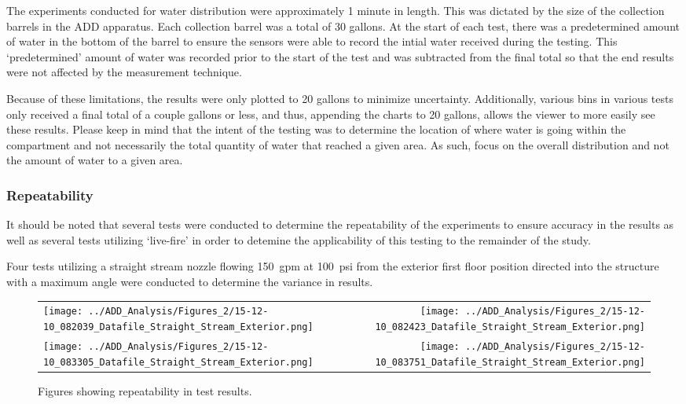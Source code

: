 \documentclass{article}
\begin{document}
The experiments conducted for water distribution were approximately 1 minute in length. This was dictated by the size of the collection barrels in the ADD apparatus. Each collection barrel was a total of 30 gallons. At the start of each test, there was a predetermined amount of water in the bottom of the barrel to ensure the sensors were able to record the intial water received during the testing. This `predetermined' amount of water was recorded prior to the start of the test and was subtracted from the final total so that the end results were not affected by the measurement technique. 

Because of these limitations, the results were only plotted to 20 gallons to minimize uncertainty. Additionally, various bins in various tests only received a final total of a couple gallons or less, and thus, appending the charts to 20 gallons, allows the viewer to more easily see these results. Please keep in mind that the intent of the testing was to determine the location of where water is going within the compartment and not necessarily the total quantity of water that reached a given area. As such, focus on the overall distribution and not the amount of water to a given area.

\subsubsection{Repeatability}

It should be noted that several tests were conducted to determine the repeatability of the experiments to ensure accuracy in the results as well as several tests utilizing `live-fire' in order to detemine the applicability of this testing to the remainder of the study.

Four tests utilizing a straight stream nozzle flowing 150~gpm at 100~psi from the exterior first floor position directed into the structure with a maximum angle were conducted to determine the variance in results.

\clearpage

\begin{figure}[ht]
\begin{tabular*}{\textwidth}{lr}
\texttt{[image: ../ADD\_Analysis/Figures\_2/15-12-10\_082039\_Datafile\_Straight\_Stream\_Exterior.png]} &
\texttt{[image: ../ADD\_Analysis/Figures\_2/15-12-10\_082423\_Datafile\_Straight\_Stream\_Exterior.png]} \\
\texttt{[image: ../ADD\_Analysis/Figures\_2/15-12-10\_083305\_Datafile\_Straight\_Stream\_Exterior.png]} &
\texttt{[image: ../ADD\_Analysis/Figures\_2/15-12-10\_083751\_Datafile\_Straight\_Stream\_Exterior.png]} \\
\end{tabular*}
\caption{Figures showing repeatability in test results.}
\label{fig:Repeatability_Testing}
\end{figure}
\end{document}
